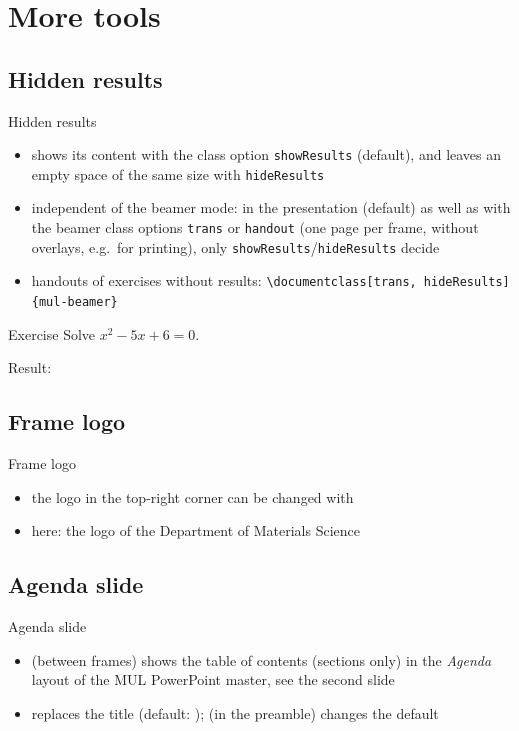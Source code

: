 \section{More tools}
\subsection{Hidden results}
\begin{frame}{Hidden results}
	\begin{itemize}[<1->]
		\item {} shows its content with the class option \texttt{showResults} (default), and leaves an empty space of the same size with \texttt{hideResults}
		\item independent of the beamer mode: in the presentation (default) as well as with the beamer class options \texttt{trans} or \texttt{handout} (one page per frame, without overlays, e.g.\ for printing), only \texttt{showResults}/\texttt{hideResults} decide
		\item handouts of exercises without results: \texttt{\textbackslash documentclass[trans, hideResults]\{mul-beamer\}}
	\end{itemize}
	\bigskip
	\begin{block}{Exercise}
		Solve $x^2 - 5x + 6 = 0$.\par\medskip
		Result: 
	\end{block}
\end{frame}
%
\subsection{Frame logo}
{%
\begin{frame}{Frame logo}
	\begin{itemize}[<1->]
		\item the logo in the top-right corner can be changed with 
		\item here: the logo of the Department of Materials Science
	\end{itemize}
\end{frame}
}%
%
\subsection{Agenda slide}
\begin{frame}{Agenda slide}
	\begin{itemize}[<1->]
		\item {} (between frames) shows the table of contents (sections only) in the \emph{Agenda} layout of the MUL PowerPoint master, see the second slide
		\item {} replaces the title (default: \emph{\MULagendaText});  (in the preamble) changes the default
	\end{itemize}
\end{frame}
%
